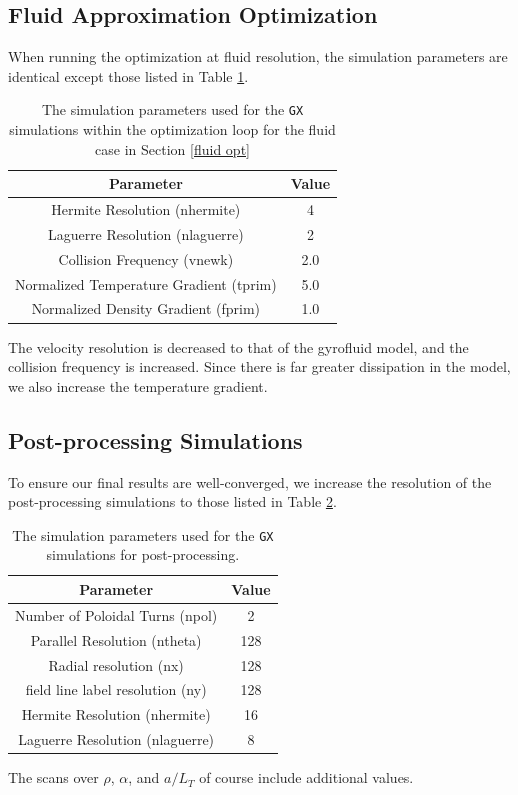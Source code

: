 \documentclass{jpp}
\begin{document}
\subsection{Fluid Approximation Optimization}
When running the optimization at fluid resolution, the simulation parameters are identical except those listed in Table \ref{sim table fluid}.
\begin{table}
\centering
    \begin{tabular}{cc}
     \hline
 Parameter & Value\\ [0.5ex] 
 \hline\hline
Hermite Resolution (nhermite) & 4 \\
\hline
Laguerre Resolution (nlaguerre) & 2\\
\hline
Collision Frequency (vnewk) & 2.0\\
\hline
Normalized Temperature Gradient (tprim) & 5.0 \\
\hline
Normalized Density Gradient (fprim) & 1.0 \\
\hline
    \end{tabular}
\caption{The simulation parameters used for the {\tt GX} simulations within the optimization loop for the fluid case in Section \ref{fluid opt}}
\label{sim table fluid}
\end{table}
The velocity resolution is decreased to that of the gyrofluid model, and the collision frequency is increased. Since there is far greater dissipation in the model, we also increase the temperature gradient.

\subsection{Post-processing Simulations}
To ensure our final results are well-converged, we increase the resolution of the post-processing simulations to those listed in Table \ref{sim table post}.
\begin{table}
\centering
    \begin{tabular}{cc}
     \hline
 Parameter & Value\\ [0.5ex] 
 \hline\hline
Number of Poloidal Turns (npol) & 2\\
\hline
Parallel Resolution (ntheta) & 128 \\
\hline
Radial resolution (nx)& 128 \\
\hline
field line label resolution (ny) & 128 \\
\hline
Hermite Resolution (nhermite) & 16 \\
\hline
Laguerre Resolution (nlaguerre) & 8\\
\hline
    \end{tabular}
\caption{The simulation parameters used for the {\tt GX} simulations for post-processing.}
\label{sim table post}
\end{table}
The scans over $\rho$, $\alpha$, and $a/L_T$ of course include additional values.
\end{document}
